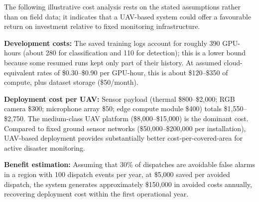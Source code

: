 The following illustrative cost analysis rests on the stated assumptions rather than on field data; it indicates that a UAV-based system could offer a favourable return on investment relative to fixed monitoring infrastructure.

\textbf{Development costs:} The saved training logs account for roughly 390 GPU-hours (about 280 for classification and 110 for detection); this is a lower bound because some resumed runs kept only part of their history. At assumed cloud-equivalent rates of \$0.30--\$0.90 per GPU-hour, this is about \$120--\$350 of compute, plus dataset storage (\$50/month).

\textbf{Deployment cost per UAV:} Sensor payload (thermal \$800--\$2,000; RGB camera \$300; microphone array \$50; edge compute module \$400) totals \$1,550--\$2,750. The medium-class UAV platform (\$8,000--\$15,000) is the dominant cost. Compared to fixed ground sensor networks (\$50,000--\$200,000 per installation), UAV-based deployment provides substantially better cost-per-covered-area for active disaster monitoring.

\textbf{Benefit estimation:} Assuming that 30\% of dispatches are avoidable false alarms in a region with 100 dispatch events per year, at \$5,000 saved per avoided dispatch, the system generates approximately \$150,000 in avoided costs annually, recovering deployment cost within the first operational year.

